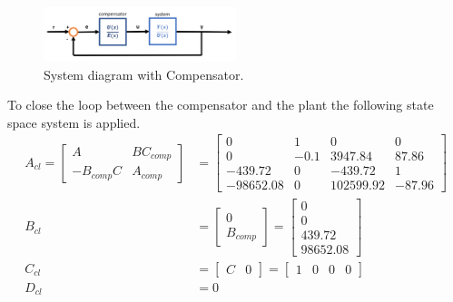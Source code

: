 \documentclass[11pt]{article}
\begin{document}
\begin{enumerate}[label=\textbf{\arabic*.}]
  \begin{figure}[H]
    \centering
    \includegraphics[width=0.5\textwidth]{p4-1.png}
    \caption{System diagram with Compensator.}
  \end{figure}

  To close the loop between the compensator and the plant the following state 
  space system is applied.
  \begin{equation}
    \begin{split}
      A_{cl} =
      \begin{bmatrix}
        A & BC_{comp} \\ -B_{comp}C & A_{comp}
      \end{bmatrix} 
      &=
      \begin{bmatrix}
        0 & 1 & 0 & 0 \\ 
        0 & -0.1 & 3947.84 & 87.86 \\ 
        -439.72 & 0 & -439.72 & 1 \\
        -98652.08 & 0 & 102599.92 & -87.96
      \end{bmatrix} \\
      B_{cl} &= 
      \begin{bmatrix}
        0 \\ B_{comp}
      \end{bmatrix} 
      =
      \begin{bmatrix}
        0 \\ 0 \\ 439.72 \\ 98652.08
      \end{bmatrix} \\
      C_{cl} &=
      \begin{bmatrix}
        C & 0
      \end{bmatrix}
      =
      \begin{bmatrix}
        1 & 0 & 0 & 0
      \end{bmatrix} \\
      D_{cl} &= 0
    \end{split}
  \end{equation}


\end{enumerate}
\end{document}
